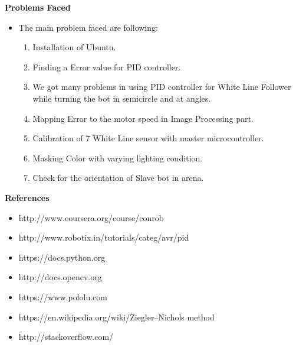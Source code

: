 \documentclass[report]{res}
\begin{document}
	\pagebreak
	
	
	\begin{center}
		{\huge\textbf{Problems Faced}\par}
	\end{center}
	
	\begin{itemize}
		\item The main problem faced are following:
		\begin{enumerate}
			\item Installation of Ubuntu.
			\item Finding a Error value for PID controller.
			\item We got many problems in using PID controller for White Line Follower while turning the bot in semicircle and at angles.
			\item Mapping Error to the motor speed in Image Processing part.
			\item Calibration of 7 White Line sensor with master microcontroller.
			\item Masking Color with varying lighting condition.
			\item Check for the orientation of Slave bot in arena.
		\end{enumerate}
	\end{itemize}
	
	\pagebreak
	
	
	\begin{center}
		{\huge\textbf{References}\par}
	\end{center}
	
	\begin{itemize}
	
		\item http://www.coursera.org/course/conrob
		\item http://www.robotix.in/tutorials/categ/avr/pid
		\item https://docs.python.org
		\item http://docs.opencv.org
		\item https://www.pololu.com
		\item https://en.wikipedia.org/wiki/Ziegler–Nichols method
		\item http://stackoverflow.com/
	
	\end{itemize}
	
\end{document}

